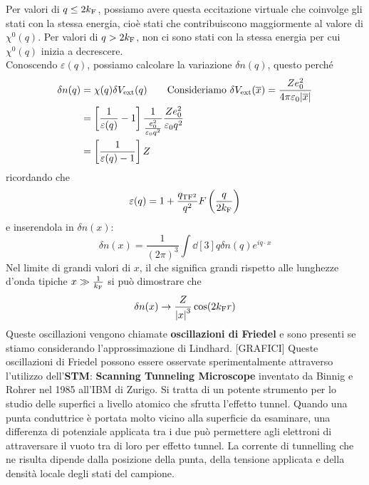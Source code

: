Per valori di $q \leq 2k_{\text F}$, possiamo avere questa eccitazione virtuale che coinvolge gli stati con la stessa energia, cioè stati che contribuiscono maggiormente al valore di $\chi^0(q)$.
Per valori di $q > 2k_{\text F}$, non ci sono stati con la stessa energia per cui $\chi^0(q)$ inizia a decrescere.\\
Conoscendo $\varepsilon(q)$, possiamo calcolare la variazione $\delta n (q)$, questo perché
\begin{equation*}
    \begin{aligned}
        \delta n(q) &= \chi(q)\delta V_{\text{ext}}(q) \qquad \text{Consideriamo }\delta V_{\text{ext}}(\overline x)=\frac{Ze_0^2}{4\pi\varepsilon_0\abs{\overline x}}\\
                     &= \left[\frac{1}{\varepsilon(q)}-1\right]\frac{1}{\frac{e_0^2}{\varepsilon_0 q^2}}\frac{Ze_0^2}{\varepsilon_0q^2} \\
                     &= \left[\frac{1}{\varepsilon(q)-1}\right]Z
    \end{aligned}
\end{equation*}
ricordando che
\begin{equation*}
    \varepsilon(q)=1+\frac{q_{\text {TF}^2}}{q^2}F\left(\frac{q}{2k_{\text F}}\right)
\end{equation*}
e inserendola in $\delta n(x)$:
\begin{equation*}
    \delta n(x)=\frac{1}{(2\pi)^3}\int \dd[3]q \delta n(q)e^{iq\cdot x}
\end{equation*}
Nel limite di grandi valori di $x$, il che significa grandi rispetto alle lunghezze d'onda tipiche $x\gg \frac{1}{k_{\text F}}$ si può dimostrare che
\begin{equation*}
    \delta n(x)\rightarrow \frac{Z}{\abs{x}^3}\cos (2k_{\text F}r)
\end{equation*}
Queste oscillazioni vengono chiamate \textbf{oscillazioni di Friedel} e sono presenti se stiamo considerando l'approssimazione di Lindhard.
[GRAFICI]
Queste oscillazioni di Friedel possono essere osservate sperimentalmente attraverso l'utilizzo dell'\textbf{STM}: \textbf{Scanning Tunneling Microscope} inventato da Binnig e Rohrer nel 1985 all'IBM di Zurigo. Si tratta di un potente strumento per lo studio delle superfici a livello atomico che sfrutta l'effetto tunnel. Quando una punta conduttrice è portata molto vicino alla superficie da esaminare, una differenza di potenziale applicata tra i due può permettere agli elettroni di attraversare il vuoto tra di loro per effetto tunnel. La corrente di tunnelling che ne risulta dipende dalla posizione della punta, della tensione applicata e della densità locale degli stati del campione. \\
